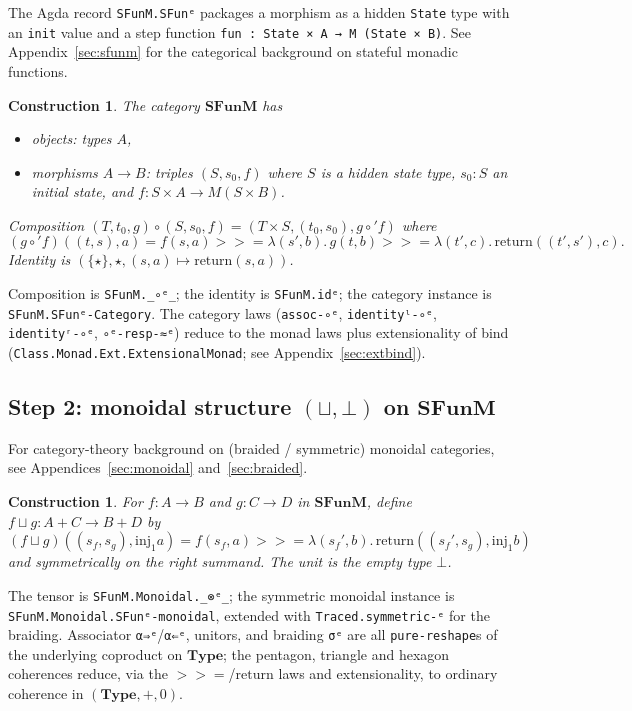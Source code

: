 \documentclass[11pt]{article}
\newtheorem{construction}[theorem]{Construction}
\newcommand{\SFunM}{\mathbf{SFunM}}
\newcommand{\bind}{\mathbin{>\!\!\!>\!\!=}}
\newcommand{\ret}{\mathrm{return}}
\begin{document}
The Agda record \texttt{SFunM.SFunᵉ} packages a morphism as a hidden
\texttt{State} type with an \texttt{init} value and a step function
\texttt{fun : State × A → M (State × B)}.  See
Appendix~\ref{sec:sfunm} for the categorical background on stateful
monadic functions.

\begin{construction}
The category $\SFunM$ has
\begin{itemize}
  \item objects: types $A$,
  \item morphisms $A \to B$: triples $(S, s_0, f)$ where
        $S$ is a hidden \emph{state} type, $s_0 : S$ an
        \emph{initial state}, and $f : S \times A \to M(S \times B)$.
\end{itemize}
Composition $(T, t_0, g) \circ (S, s_0, f) = (T \times S, (t_0, s_0), g \circ' f)$
where
\[
  (g \circ' f)((t, s), a) = f(s, a) \bind \lambda (s', b).\,
                            g(t, b) \bind \lambda (t', c).\,
                            \ret((t', s'), c).
\]
Identity is $(\{\star\}, \star, (s, a) \mapsto \ret(s, a))$.
\end{construction}

Composition is \texttt{SFunM.\_∘ᵉ\_}; the identity is
\texttt{SFunM.idᵉ}; the category instance is
\texttt{SFunM.SFunᵉ-Category}.  The category laws
(\texttt{assoc-∘ᵉ}, \texttt{identityˡ-∘ᵉ}, \texttt{identityʳ-∘ᵉ},
\texttt{∘ᵉ-resp-≈ᵉ}) reduce to the monad laws plus extensionality of
bind (\texttt{Class.Monad.Ext.ExtensionalMonad}; see
Appendix~\ref{sec:extbind}).

\subsection{Step 2: monoidal structure $(\sqcup, \bot)$ on $\SFunM$}

For category-theory background on (braided / symmetric) monoidal
categories, see Appendices~\ref{sec:monoidal} and~\ref{sec:braided}.

\begin{construction}
For $f : A \to B$ and $g : C \to D$ in $\SFunM$, define
$f \sqcup g : A + C \to B + D$ by
\[
  (f \sqcup g)((s_f, s_g), \mathrm{inj}_1 a) = f(s_f, a) \bind \lambda (s_f', b).\,
                                                \ret((s_f', s_g), \mathrm{inj}_1 b)
\]
and symmetrically on the right summand.  The unit is the empty type
$\bot$.
\end{construction}

The tensor is \texttt{SFunM.Monoidal.\_⊗ᵉ\_}; the symmetric monoidal
instance is \texttt{SFunM.Monoidal.SFunᵉ-monoidal}, extended with
\texttt{Traced.symmetric-ᵉ} for the braiding.  Associator
\texttt{α⇒ᵉ}/\texttt{α⇐ᵉ}, unitors, and braiding \texttt{σᵉ} are all
\texttt{pure-reshape}s of the underlying coproduct on $\mathbf{Type}$;
the pentagon, triangle and hexagon coherences reduce, via the
$\bind$/$\ret$ laws and extensionality, to ordinary coherence in
$(\mathbf{Type}, +, 0)$.
\end{document}
